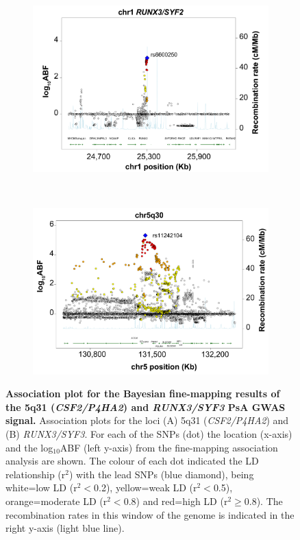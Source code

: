 \begin{figure}[htbp]
\centering
\begin{subfigure}[b]{0.5\textwidth}
\centering 
\includegraphics[width=\textwidth]{./Results3/pdfs/PSA_FM_Immunochip_RUNX3_association_plot}%
\caption{}
\end{subfigure}%
~
\begin{subfigure}[b]{0.5\textwidth}
\centering 
\includegraphics[width=\textwidth]{./Results3/pdfs/PSA_FM_Immunochip_5q31_association_plot}%
\caption{}
\end{subfigure}%
\caption[Association plot for the Bayesian fine-mapping results of the 5q31 (\textit{CSF2/P4HA2}) and \textit{RUNX3/SYF3} PsA GWAS signal.]{\textbf{Association plot for the Bayesian fine-mapping results of the 5q31 (\textit{CSF2/P4HA2}) and \textit{RUNX3/SYF3} PsA GWAS signal.} Association plots for the loci (A) 5q31 (\textit{CSF2/P4HA2}) and (B) \textit{RUNX3/SYF3}. For each of the SNPs (dot) the location (x-axis) and the log$_{10}$ABF (left y-axis) from the fine-mapping association analysis are shown. The colour of each dot indicated the LD relationship (r$^2$) with the lead SNPs (blue diamond), being white=low LD (r$^{2}<$0.2), yellow=weak LD (r$^{2}<$0.5), orange=moderate LD (r$^{2}<$0.8) and red=high LD (r$^{2}$$\geq$0.8). The recombination rates in this window of the genome is indicated in the right y-axis (light blue line).}
\label{figure:RUNX3_chr5q31_fine_mapping_association_plot}
\end{figure}



